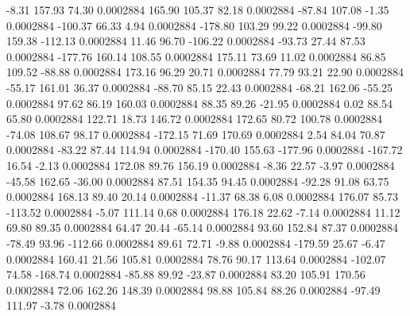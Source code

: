        -8.31      157.93       74.30     0.0002884
      165.90      105.37       82.18     0.0002884
      -87.84      107.08       -1.35     0.0002884
     -100.37       66.33        4.94     0.0002884
     -178.80      103.29       99.22     0.0002884
      -99.80      159.38     -112.13     0.0002884
       11.46       96.70     -106.22     0.0002884
      -93.73       27.44       87.53     0.0002884
     -177.76      160.14      108.55     0.0002884
      175.11       73.69       11.02     0.0002884
       86.85      109.52      -88.88     0.0002884
      173.16       96.29       20.71     0.0002884
       77.79       93.21       22.90     0.0002884
      -55.17      161.01       36.37     0.0002884
      -88.70       85.15       22.43     0.0002884
      -68.21      162.06      -55.25     0.0002884
       97.62       86.19      160.03     0.0002884
       88.35       89.26      -21.95     0.0002884
        0.02       88.54       65.80     0.0002884
      122.71       18.73      146.72     0.0002884
      172.65       80.72      100.78     0.0002884
      -74.08      108.67       98.17     0.0002884
     -172.15       71.69      170.69     0.0002884
        2.54       84.04       70.87     0.0002884
      -83.22       87.44      114.94     0.0002884
     -170.40      155.63     -177.96     0.0002884
     -167.72       16.54       -2.13     0.0002884
      172.08       89.76      156.19     0.0002884
       -8.36       22.57       -3.97     0.0002884
      -45.58      162.65      -36.00     0.0002884
       87.51      154.35       94.45     0.0002884
      -92.28       91.08       63.75     0.0002884
      168.13       89.40       20.14     0.0002884
      -11.37       68.38        6.08     0.0002884
      176.07       85.73     -113.52     0.0002884
       -5.07      111.14        0.68     0.0002884
      176.18       22.62       -7.14     0.0002884
       11.12       69.80       89.35     0.0002884
       64.47       20.44      -65.14     0.0002884
       93.60      152.84       87.37     0.0002884
      -78.49       93.96     -112.66     0.0002884
       89.61       72.71       -9.88     0.0002884
     -179.59       25.67       -6.47     0.0002884
      160.41       21.56      105.81     0.0002884
       78.76       90.17      113.64     0.0002884
     -102.07       74.58     -168.74     0.0002884
      -85.88       89.92      -23.87     0.0002884
       83.20      105.91      170.56     0.0002884
       72.06      162.26      148.39     0.0002884
       98.88      105.84       88.26     0.0002884
      -97.49      111.97       -3.78     0.0002884
